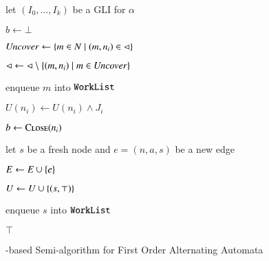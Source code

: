 \begin{algorithm}[t!]
\begin{algorithmic}[1]
  \Else {}

  \State let $(I_0,\ldots,I_k)$ be a GLI for $\alpha$
  \label{ln:refine-begin}

  \State $b \leftarrow \bot$



  \State $\mathit{Uncover} \leftarrow \{  m \in N \mid (m,n_i) \in \lhd  \}$
  
  \State $\lhd \leftarrow \lhd \setminus \{ (m,n_i) \mid m \in \mathit{Uncover} \}$


  \State enqueue $m$ into $\mathtt{WorkList}$
  
  \EndFor
  
  \State $U(n_i) \leftarrow U(n_i) \wedge J_i$


  \State $b \leftarrow \Call{Close}{n_i}$
  \label{ln:refine-end}

  \EndIf %

  \EndIf %

  \EndFor 

  \EndIf %


  \label{ln:expand-begin}

  \State let $s$ be a fresh node and $e = (n,a,s)$ be a new edge

  \State $E \leftarrow E \cup \{ e \}$
  \label{ln:edge-insert}

  \State $U \leftarrow U \cup \{ (s,\top) \}$

  \State enqueue $s$ into $\mathtt{WorkList}$
  \label{ln:expand-end}

  \EndFor

  \EndIf %

  \EndWhile  

   $\top$
\end{algorithmic}
\caption{\impact-based Semi-algorithm for First Order Alternating Automata}
\label{alg:impact}
\end{algorithm}

